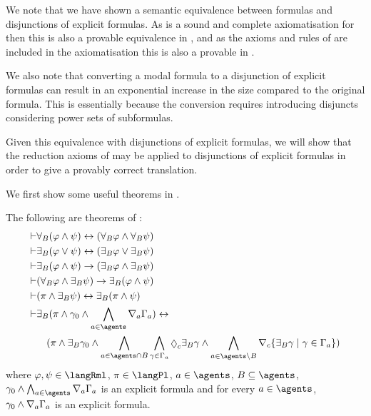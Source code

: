 We note that we have shown a semantic equivalence between \langMl{} formulas and disjunctions of explicit formulas.
As \axiomS{} is a sound and complete axiomatisation for \logicS{} then this is also a provable equivalence in \axiomS{}, and as the axioms and rules of \axiomS{} are included in the axiomatisation \axiomRmlS{} this is also a provable in \axiomRmlS{}.

We also note that converting a modal formula to a disjunction of explicit formulas can result in an exponential increase in the size compared to the original formula.
This is essentially because the conversion requires introducing disjuncts considering power sets of subformulas.

Given this equivalence with disjunctions of explicit formulas, we will show that the reduction axioms of \axiomRmlS{} may be applied to disjunctions of explicit formulas in order to give a provably correct translation.

We first show some useful theorems in \axiomRmlS{}.

\begin{lemma}\label{rml-s5-theorems}
The following are theorems of \axiomRmlKFF{}:
\begin{align}
    \proves & \allrefsBs (\phi \land \psi) \iff (\allrefsBs \phi \land \allrefsBs \psi) \label{rml-s5-and}\\
    \proves & \somerefsBs (\phi \lor \psi) \iff (\somerefsBs \phi \lor \somerefsBs \psi) \label{rml-s5-or}\\
    \proves & \somerefsBs (\phi \land \psi) \implies (\somerefsBs \phi \land \somerefsBs \psi) \label{rml-s5-d-and}\\
    \proves & (\allrefsBs \phi \land \somerefsBs \psi) \implies \somerefsBs (\phi \land \psi) \label{rml-s5-db-and}\\
    \proves & (\pi \land \somerefsBs \psi) \iff \somerefsBs (\pi \land \psi) \label{rml-s5-pd-and}\\
    \proves & \displaystyle \somerefsBs (\pi \land \gamma_0 \land \bigwedge_{\agentA \in \agents} \coverA \Gamma_\agentA) \iff \nonumber\\
            & \displaystyle \quad
            (
            \pi \land
            \somerefsBs \gamma_0 \land
            \bigwedge_{\agentA \in \agents \cap \agentsB} \bigwedge_{\gamma \in \Gamma_\agentA} \possibleC \somerefsBs \gamma \land
            \bigwedge_{\agentA \in \agents \setminus \agentsB} \coversC \{\somerefsBs \gamma \mid \gamma \in \Gamma_\agentA\} 
            ) \label{rml-s5-cover}
\end{align}
where $\phi, \psi \in \langRml$, $\pi \in \langPl$, $\agentA \in \agents$, $\agentsB \subseteq \agents$, $\gamma_0 \land \bigwedge_{\agentA \in \agents} \coversA \Gamma_\agentA$ is an explicit formula and for every $\agentA \in \agents$, $\gamma_0 \land \nabla_{a} \Gamma_a$ is an explicit formula.
\end{lemma}

